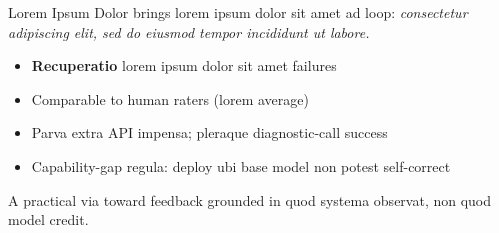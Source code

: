 
\begin{contribblock}{Lorem Ipsum Dolor}
\system brings lorem ipsum dolor sit amet ad loop: \emph{consectetur adipiscing elit, sed do eiusmod tempor incididunt ut labore.}

\vspace{0.4em}
\begin{itemize}\setlength{\itemsep}{0.15em}
\item \textbf{Recuperatio} lorem ipsum dolor sit amet failures
\item Comparable to human raters (lorem average)
\item Parva extra API impensa; pleraque diagnostic-call success
\item Capability-gap regula: deploy ubi base model non potest self-correct
\end{itemize}

\vspace{0.4em}
A practical via toward feedback grounded in quod systema observat, non quod model credit.
\end{contribblock}

